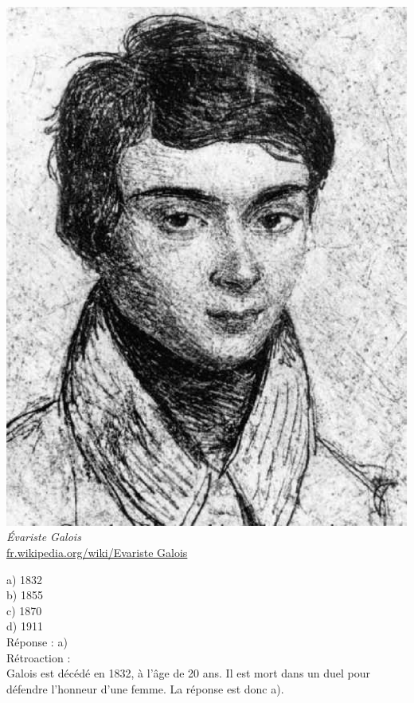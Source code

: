 \documentclass[letterpaper, 12pt]{article}
\begin{document}
\begin{center}
\includegraphics[scale=0.15]{Evariste_galois.eps}\\
\emph{{\small \'Evariste Galois}}\\
\href{http://fr.wikipedia.org/wiki/Evariste Galois}{fr.wikipedia.org/wiki/Evariste Galois}
\end{center}

a) 1832\\
b) 1855\\
c) 1870\\
d) 1911\\

R\'eponse : a)\\

R\'etroaction :\\
Galois est d\'ec\'ed\'e en 1832, \`a l'\^age de 20 ans. Il est mort dans un duel pour d\'efendre l'honneur d'une femme. La r\'eponse est donc a).\\
\end{document}
